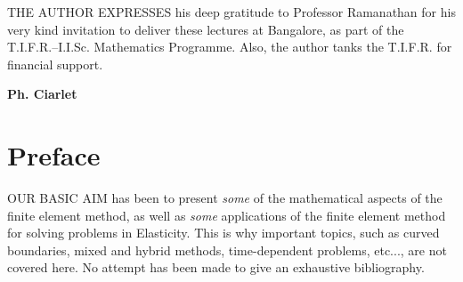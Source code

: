 THE AUTHOR EXPRESSES his deep gratitude to Professor Ramana\-than for
his very kind invitation to deliver these lectures at Bangalore, as
part of the T.I.F.R.--I.I.Sc. Mathematics Programme. Also, the author
tanks the T.I.F.R. for financial support.  
\vskip 2cm

\hfill{\large\bf Ph. Ciarlet}



\chapter{Preface}

OUR BASIC AIM has been to present {\em some} of the mathematical
aspects of the finite element method, as well as {\em some}
applications of the finite element method for solving problems in
Elasticity. This is why important topics, such as curved boundaries,
mixed and hybrid methods, time-dependent problems, etc..., are not
covered here. No attempt has been made to give an exhaustive
bibliography. 

